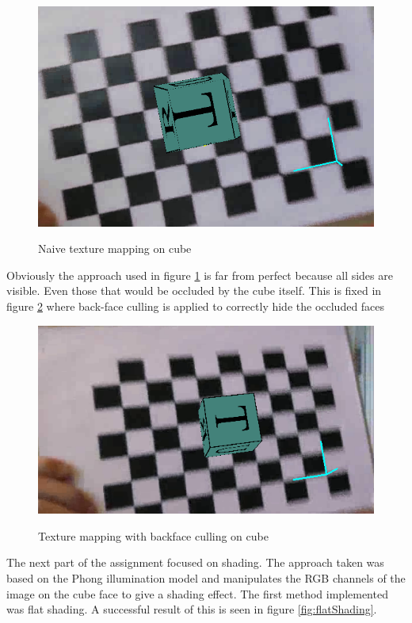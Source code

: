 \begin{figure}[!htbp]
    \includegraphics{pics/noCulling.png}
    \label{fig:noCulling}
    \caption{Naive texture mapping on cube}
\end{figure}


Obviously the approach used in figure \ref{fig:noCulling} is far from perfect
because all sides are visible. Even those that would be occluded by the cube
itself. This is fixed in figure \ref{fig:withCulling} where back-face culling
is applied to correctly hide the occluded faces

\begin{figure}[!htbp]
    \includegraphics{pics/withCulling.png}
    \label{fig:withCulling}
    \caption{Texture mapping with backface culling on cube}
\end{figure}

The next part of the assignment focused on shading. The approach taken was 
based on the Phong illumination model and manipulates the RGB channels of the 
image on the cube face to give a shading effect. The first method implemented 
was flat shading. A successful result of this is seen in figure \ref{fig:flatShading}.

